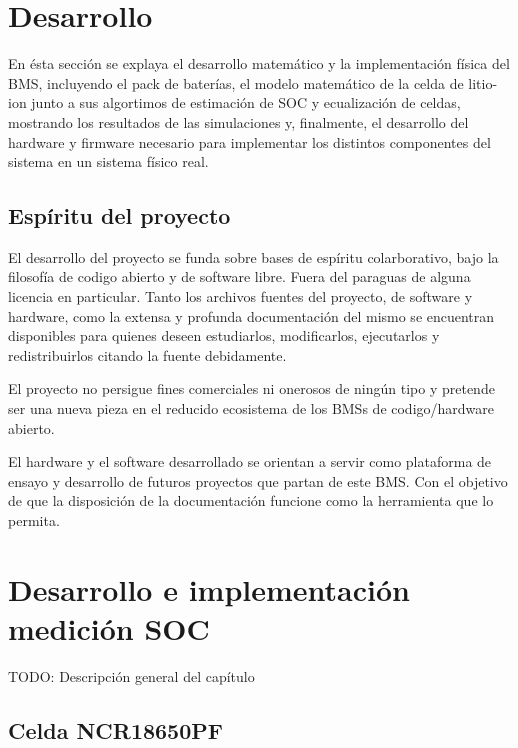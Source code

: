 \documentclass[10pt, a4paper]{report}
\begin{document}
\thispagestyle{fancy}



\chapter{Desarrollo}\label{desarrollo}
\thispagestyle{fancy}

En \'esta secci\'on se explaya el desarrollo matem\'atico y la implementaci\'on 
f\'isica del \acrshort{BMS}, incluyendo el pack de bater\'ias, el modelo 
matem\'atico de la celda de litio-ion junto a sus algortimos de estimaci\'on de 
\acrshort{SOC} y ecualizaci\'on de celdas, mostrando los resultados de las
simulaciones y, finalmente, el desarrollo del hardware y firmware necesario para
implementar los distintos componentes del sistema en un sistema f\'isico real.

\section{Espíritu del proyecto}

El desarrollo del proyecto se funda sobre bases de espíritu colarborativo, bajo
la filosofía de codigo abierto y de software libre. Fuera del paraguas de alguna
licencia en particular. Tanto los archivos fuentes del proyecto, de software y
hardware, como la extensa y profunda documentación del mismo se encuentran
disponibles para quienes deseen estudiarlos, modificarlos, ejecutarlos y
redistribuirlos citando la fuente debidamente. 

El proyecto no persigue fines comerciales ni onerosos de ningún tipo y pretende
ser una nueva pieza en el reducido ecosistema de los \acrshort{BMS}s de
codigo/hardware abierto.

El hardware y el software desarrollado se orientan a servir como plataforma de
ensayo y desarrollo de futuros proyectos que partan de este \acrshort{BMS}. Con
el objetivo de que la disposición de la documentación funcione como la
herramienta que lo permita.


\chapter{Desarrollo e implementación medición \acrshort{SOC}}\label{ch:dev_soc}
\thispagestyle{fancy}

TODO: Descripción general del capítulo

\section{Celda NCR18650PF} \label{seq:cel_selection}
\end{document}
